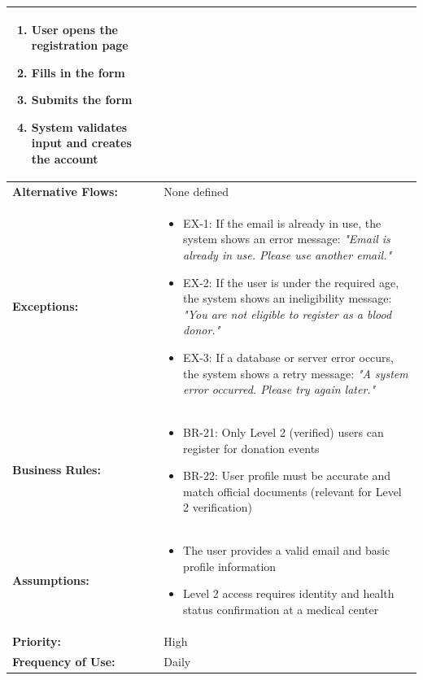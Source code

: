 \documentclass[12pt,a4paper]{article}
\begin{document}
\begin{longtable}{|p{4.5cm}|p{10.5cm}|}
\begin{enumerate}
  \item User opens the registration page
  \item Fills in the form
  \item Submits the form
  \item System validates input and creates the account
\end{enumerate} \\
\hline
\textbf{Alternative Flows:} & None defined \\
\hline
\textbf{Exceptions:} &
\begin{itemize}
  \item EX-1: If the email is already in use, the system shows an error message: \textit{"Email is already in use. Please use another email."}
  \item EX-2: If the user is under the required age, the system shows an ineligibility message: \textit{"You are not eligible to register as a blood donor."}
  \item EX-3: If a database or server error occurs, the system shows a retry message: \textit{"A system error occurred. Please try again later."}
\end{itemize} \\
\hline
\textbf{Business Rules:} &
\begin{itemize}
  \item BR-21: Only Level 2 (verified) users can register for donation events
  \item BR-22: User profile must be accurate and match official documents (relevant for Level 2 verification)
\end{itemize} \\
\hline
\textbf{Assumptions:} &
\begin{itemize}
  \item The user provides a valid email and basic profile information
  \item Level 2 access requires identity and health status confirmation at a medical center
\end{itemize} \\
\hline
\textbf{Priority:} & High \\
\hline
\textbf{Frequency of Use:} & Daily \\
\hline
\end{longtable}
\end{document}
